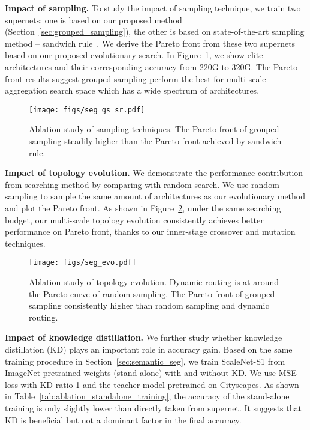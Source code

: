 \documentclass[final]{cvpr}
\newcommand{\netname}{ScaleNet\xspace}
\begin{document}
\noindent\textbf{Impact of sampling.}\label{sec:ablation_grouped_sampling}
To study the impact of sampling technique, we train two supernets: one is based on our proposed method (Section~\ref{sec:grouped_sampling}), the other is based on state-of-the-art sampling method -- sandwich rule~\cite{yu2020bignas}. 
We derive the Pareto front from these two supernets based on our proposed evolutionary search. In Figure~\ref{fig:grouped_sample}, we show elite architectures and their corresponding accuracy from 220G to 320G. The Pareto front results suggest grouped sampling perform the best for multi-scale aggregation search space which has a wide spectrum of architectures.


\begin{figure}
    \centering
    \texttt{[image: figs/seg\_gs\_sr.pdf]}
    \caption{
    Ablation study of sampling techniques. The Pareto front of grouped sampling steadily higher than the Pareto front achieved by sandwich rule.
    }
    \label{fig:grouped_sample}
\end{figure}

\noindent\textbf{Impact of topology evolution.}
We demonstrate the performance contribution from searching method by comparing with random search. 
We use random sampling to sample the same amount of architectures as our evolutionary method and plot the Pareto front. As shown in Figure~\ref{fig:abl_evo}, under the same searching budget, our multi-scale topology evolution consistently achieves better performance on Pareto front, thanks to our inner-stage crossover and mutation techniques.


\label{sec:ablation_topology_evolution}
\begin{figure}
    \centering
    \texttt{[image: figs/seg\_evo.pdf]}
    \caption{Ablation study of topology evolution. Dynamic routing is at around the Pareto curve of random sampling. The Pareto front of grouped sampling consistently higher than random sampling and dynamic routing.
    }
    \label{fig:abl_evo}
\end{figure}

\noindent\textbf{Impact of knowledge distillation.}
We further study whether knowledge distillation (KD) plays an important role in accuracy gain.
Based on the same training procedure in Section~\ref{sec:semantic_seg}, we train \netname -S1 from ImageNet pretrained weights (stand-alone) with and without KD. We use MSE loss with KD ratio 1 and the teacher model pretrained on Cityscapes. As shown in Table~\ref{tab:ablation_standalone_training}, the accuracy of the stand-alone training is only slightly lower than directly taken from supernet. It suggests that KD is beneficial but not a dominant factor in the final accuracy.
\end{document}
